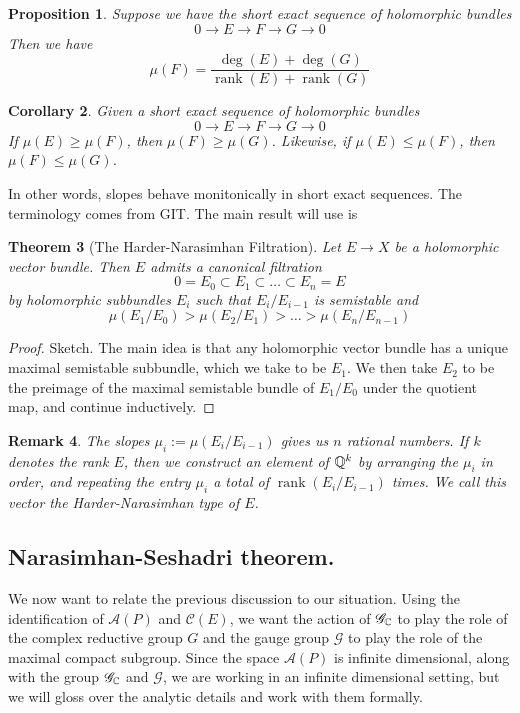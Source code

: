 \documentclass[11pt]{amsart}
\numberwithin{equation}{section}
\theoremstyle{plain}
\theoremstyle{plain}
\newtheorem{thmsub}{Theorem}[subsection]
\newtheorem{corsub}[thmsub]{Corollary}
\newtheorem{propsub}[thmsub]{Proposition}
\newtheorem{remksub}[thmsub]{Remark}
\numberwithin{equation}{section}
\begin{document}
\begin{propsub}
Suppose we have the short exact sequence of holomorphic bundles
$$
0\to E\to F\to G\to0
$$
Then we have
$$
\mu(F)=\frac{\operatorname{deg}(E)+\operatorname{deg}(G)}{\operatorname{rank}(E)+\operatorname{rank}(G)}
$$
\end{propsub}
\begin{corsub}
Given a short exact sequence of holomorphic bundles
$$
0\to E\to F\to G\to 0
$$
If $\mu(E)\ge\mu(F)$, then $\mu(F)\ge\mu(G)$. Likewise, if $\mu(E)\leq\mu(F)$, then $\mu(F)\leq\mu(G)$.
\end{corsub}
In other words, slopes behave monitonically in short exact sequences. The terminology comes from GIT. The main result will use is
\begin{thmsub}[The Harder-Narasimhan Filtration]
Let $E\to X$ be a holomorphic vector bundle. Then $E$ admits a canonical filtration
$$
0=E_0\subset E_1\subset\dots\subset E_n=E
$$
by holomorphic subbundles $E_i$ such that $E_i/E_{i-1}$ is semistable and 
$$
\mu(E_1/E_0)>\mu(E_2/E_1)>\dots>\mu(E_n/E_{n-1})
$$
\end{thmsub}
\begin{proof}
Sketch. The main idea is that any holomorphic vector bundle has a unique maximal semistable subbundle, which we take to be $E_1$. We then take $E_2$ to be the preimage of the maximal semistable bundle of $E_1/E_0$ under the quotient map, and continue inductively.
\end{proof}
\begin{remksub}\normalfont
The slopes $\mu_i:=\mu(E_i/E_{i-1})$ gives us $n$ rational numbers. If $k$ denotes the rank $E$, then we construct an element of $\Bbb{Q}^k$ by arranging the $\mu_i$ in order, and repeating the entry $\mu_i$ a total of $\operatorname{rank}(E_i/E_{i-1})$ times. We call this vector the Harder-Narasimhan type of $E$.
\end{remksub}
\subsection{Narasimhan-Seshadri theorem.}

We now want to relate the previous discussion to our situation. Using the identification of $\mathscr{A}(P)$ and $\mathscr{C}(E)$, we want the action of $\mathscr{G}_{\Bbb{C}}$ to play the role of the complex reductive group $G$ and the gauge group $\mathscr{G}$ to play the role of the maximal compact subgroup. Since the space $\mathscr{A}(P)$ is infinite dimensional, along with the group $\mathscr{G}_{\Bbb{C}}$ and $\mathscr{G}$, we are working in an infinite dimensional setting, but we will gloss over the analytic details and work with them formally.
\end{document}
